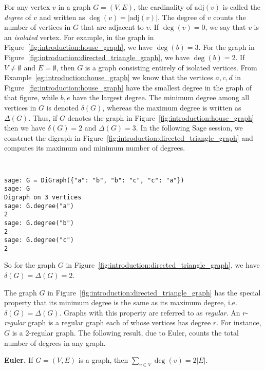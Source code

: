 For any vertex $v$ in a graph $G = (V, E)$, the cardinality of
$\text{adj}(v)$ is called the \emph{degree} of $v$ and written as
$\deg(v) = |\text{adj}(v)|$. The degree of $v$ counts the number of
vertices in $G$ that are adjacent to $v$. If $\deg(v) = 0$, we say
that $v$ is an \emph{isolated} vertex. For example, in the graph in
Figure~\ref{fig:introduction:house_graph}, we have $\deg(b) = 3$. For
the graph in Figure~\ref{fig:introduction:directed_triangle_graph}, we
have $\deg(b) = 2$. If $V \neq \emptyset$ and $E = \emptyset$, then
$G$ is a graph consisting entirely of isolated vertices. From
Example~\ref{eg:introduction:house_graph} we know that the vertices
$a, c, d$ in Figure~\ref{fig:introduction:house_graph} have the
smallest degree in the graph of that figure, while $b, e$ have the
largest degree. The minimum degree among all vertices in $G$ is
denoted $\delta(G)$, whereas the maximum degree is written as
$\Delta(G)$. Thus, if $G$ denotes the graph in
Figure~\ref{fig:introduction:house_graph} then we have $\delta(G) = 2$
and $\Delta(G) = 3$. In the following Sage session, we construct the
digraph in Figure~\ref{fig:introduction:directed_triangle_graph} and
computes its maximum and minimum number of degrees.
%
\begin{center}
\fontsize{9pt}{9pt}
\selectfont
\tt
\begin{lstlisting}
sage: G = DiGraph({"a": "b", "b": "c", "c": "a"})
sage: G
Digraph on 3 vertices
sage: G.degree("a")
2
sage: G.degree("b")
2
sage: G.degree("c")
2
\end{lstlisting}
\end{center}
%
So for the graph $G$ in
Figure~\ref{fig:introduction:directed_triangle_graph}, we have
$\delta(G) = \Delta(G) = 2$.

The graph $G$ in Figure~\ref{fig:introduction:directed_triangle_graph}
has the special property that its minimum degree is the same as its
maximum degree, i.e. $\delta(G) = \Delta(G)$. Graphs with this
property are referred to as \emph{regular}. An $r$-\emph{regular}
graph is a regular graph each of whose vertices has degree $r$. For
instance, $G$ is a $2$-regular graph. The following result, due to
Euler, counts the total number of degrees in any graph.

\begin{theorem}
\label{thm:introduction:degree_sum}
\label{thm:introduction:hand_shaking}
\textbf{Euler.}
If $G = (V, E)$ is a graph, then $\sum_{v \in V} \deg(v) = 2 |E|$.
\end{theorem}

